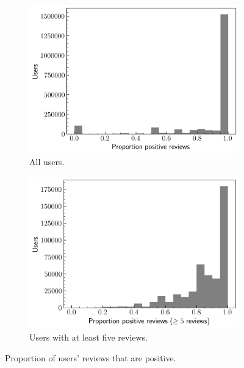 \begin{figure}[ht]
    \centering
    \begin{subfigure}[ht]{0.49\textwidth}
        \centering
        \includegraphics[width=\textwidth]{figures/03_dataset/06_hist_user_polarities_min1.png}
        \caption{All users.}
        \label{fig:Dataset_HistPolaritiesMin1}
    \end{subfigure}
    \hfill
    \begin{subfigure}[ht]{0.49\textwidth}
        \centering
        \includegraphics[width=\textwidth]{figures/03_dataset/07_hist_user_polarities_min5.png}
        \caption{Users with at least five reviews.}
        \label{fig:Dataset_HistPolaritiesMin5}
    \end{subfigure}
    \caption{Proportion of users' reviews that are positive.}
    \label{fig:Dataset_HistsPolarities}
\end{figure}

